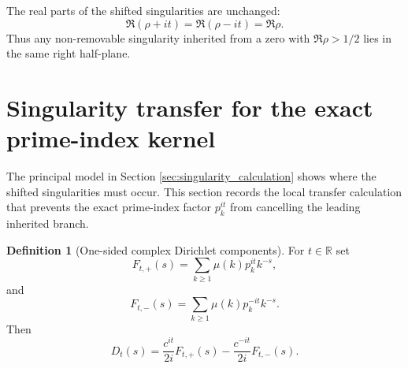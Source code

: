 \documentclass[11pt]{amsart}
\numberwithin{equation}{section}
\theoremstyle{plain}
\theoremstyle{definition}
\newtheorem{definition}[theorem]{Definition}
\theoremstyle{remark}
\begin{document}
The real parts of the shifted singularities are unchanged:
\begin{equation}
\Re(\rho+it)=\Re(\rho-it)=\Re\rho.
\label{eq:real_part_unchanged}
\end{equation}
Thus any non-removable singularity inherited from a zero with
$\Re\rho>1/2$ lies in the same right half-plane.


\section{Singularity transfer for the exact prime-index kernel}
\label{sec:singularity_transfer}

The principal model in Section \ref{sec:singularity_calculation} shows
where the shifted singularities must occur.  This section records the
local transfer calculation that prevents the exact prime-index factor
$p_k^{it}$ from cancelling the leading inherited branch.

\begin{definition}[One-sided complex Dirichlet components]
\label{def:one_sided_components}
For $t\in\mathbb R$ set
\begin{equation}
F_{t,+}(s)=\sum_{k\ge1}\mu(k)p_k^{it}k^{-s},
\label{eq:Ft_plus_definition}
\end{equation}
and
\begin{equation}
F_{t,-}(s)=\sum_{k\ge1}\mu(k)p_k^{-it}k^{-s}.
\label{eq:Ft_minus_definition}
\end{equation}
Then
\begin{equation}
D_t(s)=\frac{c^{it}}{2i}F_{t,+}(s)-\frac{c^{-it}}{2i}F_{t,-}(s).
\label{eq:Dt_Ft_components}
\end{equation}
\end{definition}
\end{document}
